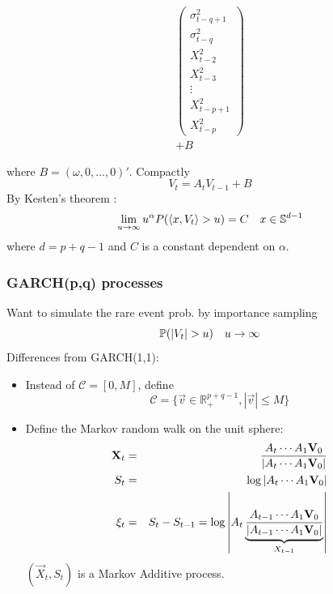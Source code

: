 \documentclass{beamer}
\begin{document}
\begin{frame}
\begin{tiny}
\begin{eqnarray*}
\begin{pmatrix}
        \sigma_{t-q+1}^2 \\
        \sigma_{t-q}^2 \\
        X_{t-2}^2 \\
        X_{t-3}^2 \\
        \vdots \\
        X_{t-p+1}^2 \\
        X_{t-p}^2
      \end{pmatrix} \\
      + B
    \end{eqnarray*}
  \end{tiny}
  \begin{small}
    where $B = (\omega, 0, \dots, 0)'$. Compactly
    \[
    V_t = A_t V_{t-1} + B
    \]
    By Kesten's theorem \cite{kesten:1973}:
    \[
    \lim_{u \to \infty} u^{\alpha} P(\inn{x, V_t} > u)
    = C \quad x \in \mathbb S^{d-1}
    \]
    where $d = p + q -1$ and $C$ is a constant dependent on $\alpha$.
  \end{small}
\end{frame}

\begin{frame}
  \frametitle{GARCH(p,q) processes}
  \begin{scriptsize}
    Want to simulate the rare event prob. by importance sampling
    \[
    \P(|V_t| > u) \quad u \to \infty  
    \]
    Differences from GARCH(1,1):
    \begin{itemize}
    \item Instead of $\mathcal C = [0, M]$, define
      \[
      \mathcal C = \{\vec v \in \mathbb R_+^{p+q-1}, |\vec v| \leq M\}
      \]
    \item Define the Markov random walk on the unit sphere:
      \begin{eqnarray*}
        \vec X_t &=& A_{t} \cdots A_1 \vec V_0 \over |A_{t} \cdots A_1 \vec V_0| \\
        S_t &=& \log |A_t \cdots A_1 \vec V_0| \\
        \xi_t &=& S_t - S_{t-1} =
        \log \left|A_t
          \underbrace{
            {A_{t-1} \cdots A_1 \vec V_0 \over |A_{t-1} \cdots A_1 \vec V_0|}
          }_{X_{t-1}}
        \right|
      \end{eqnarray*}
      $(\vec X_t, S_t)$ is a Markov Additive process.
    \end{itemize}
  \end{scriptsize}
\end{frame}
\end{document}
